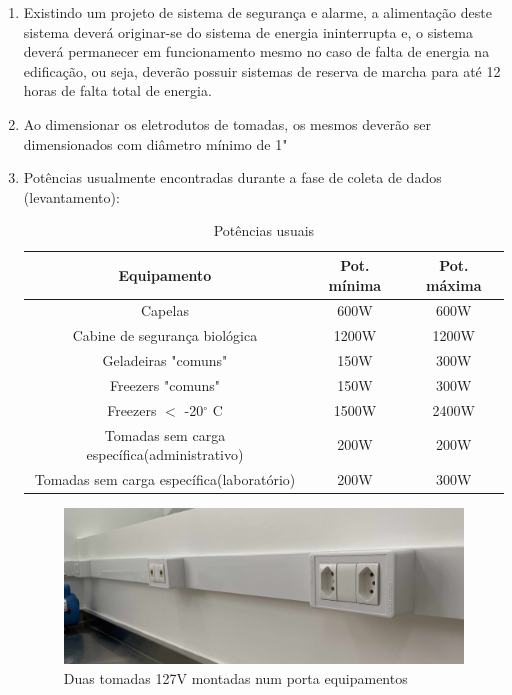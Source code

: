 \begin{enumerate}
	\item Existindo um projeto de sistema de segurança e alarme, a alimentação deste sistema deverá originar-se do sistema de energia ininterrupta e, o sistema deverá permanecer em funcionamento mesmo no caso de falta de energia na edificação, ou seja, deverão possuir sistemas de reserva de marcha para até 12 horas de falta total de energia.
	
	\item Ao dimensionar os eletrodutos de tomadas, os mesmos deverão ser dimensionados com diâmetro mínimo de 1"
	
	\item Potências usualmente encontradas durante a fase de coleta de dados (levantamento):
		\begin{table}[ht]
			\centering
			\caption{Potências usuais}
			\begin{tabular}[t]{ccc}
				\toprule
				\color{Tue-red}\textbf{Equipamento}&\color{Tue-red}\textbf{Pot. mínima}&\color{Tue-red}\textbf{Pot. máxima}\\
				\midrule
				Capelas&600W&600W\\
				Cabine de segurança biológica&1200W&1200W\\
				Geladeiras "comuns"&150W&300W\\
				Freezers "comuns"&150W&300W\\
				Freezers $<$ -20$^{\circ}$ C&1500W&2400W\\
				Tomadas sem carga específica(administrativo)&200W&200W\\
				Tomadas sem carga específica(laboratório)&200W&300W\\
				\bottomrule
			\end{tabular}
			\label{table: potencias}
		\end{table}

	\begin{figure}[H]
		\includegraphics[width=\linewidth]{Figures/4. Socket/tomada1.jpg}
		\caption{Duas tomadas 127V montadas num porta equipamentos}
		\label{fig: tomada rodameio}
	\end{figure}
	\end{enumerate}
